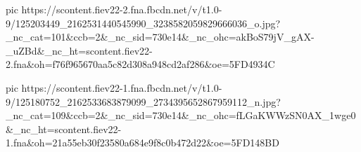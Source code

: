 pic https://scontent.fiev22-2.fna.fbcdn.net/v/t1.0-9/125203449_2162531440545990_3238582059829666036_o.jpg?_nc_cat=101&ccb=2&_nc_sid=730e14&_nc_ohc=akBoS79jV_gAX-_uZBd&_nc_ht=scontent.fiev22-2.fna&oh=f76f965670aa5c82d308a948cd2af286&oe=5FD4934C

pic https://scontent.fiev22-1.fna.fbcdn.net/v/t1.0-9/125180752_2162533683879099_2734395652867959112_n.jpg?_nc_cat=109&ccb=2&_nc_sid=730e14&_nc_ohc=fLGaKWWzSN0AX_1wge0&_nc_ht=scontent.fiev22-1.fna&oh=21a55eb30f23580a684e9f8c0b472d22&oe=5FD148BD
\fi
